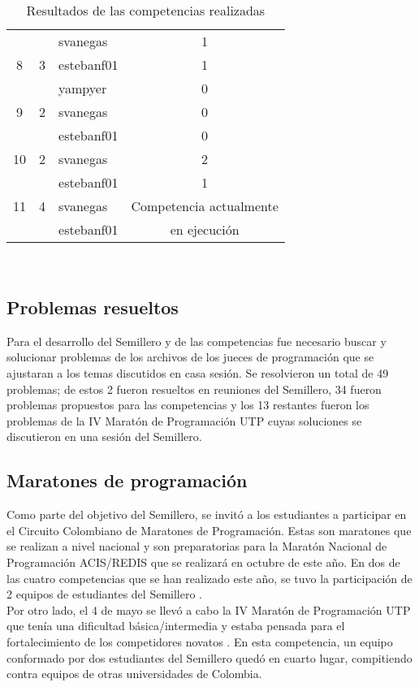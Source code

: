 \documentclass[conference]{IEEEtran}
\begin{document}
\begin{table}
\begin{tabular}{|c|c|l|c|}
		\hline
		  &   & svanegas & 1\\
		8 & 3 & estebanf01 & 1\\
		  &   & yampyer & 0\\
		\hline
		9 & 2 & svanegas & 0\\
		  &   & estebanf01 & 0\\
		\hline
		10 & 2 & svanegas & 2\\
		   &   & estebanf01 & 1\\
		\hline
		11 & 4 & svanegas & Competencia actualmente\\
		   &   & estebanf01 & en ejecución\\
		\hline
	\end{tabular} 
	
	\quad\\
	\caption{Resultados de las competencias realizadas}
	\label{Tabla:competencias}
\end{table}

\subsection{Problemas resueltos}
Para el desarrollo del Semillero y de las competencias fue necesario buscar y solucionar problemas de los archivos de los jueces de programación que se ajustaran a los temas discutidos en casa sesión. Se resolvieron un total de 49 problemas; de estos 2 fueron resueltos en reuniones del Semillero, 34 fueron problemas propuestos para las competencias y los 13 restantes fueron los problemas de la IV Maratón de Programación UTP cuyas soluciones se discutieron en una sesión del Semillero. 

\subsection{Maratones de programación}
Como parte del objetivo del Semillero, se invitó a los estudiantes a participar en el Circuito Colombiano de Maratones de Programación. Estas son maratones que se realizan a nivel nacional y son preparatorias para la Maratón Nacional de Programación ACIS/REDIS que se realizará en octubre de este año. En dos de las cuatro competencias que se han realizado este año, se tuvo la participación de 2 equipos de estudiantes del Semillero \cite{CCMP}.\\
Por otro lado, el 4 de mayo se llevó a cabo la IV Maratón de Programación UTP que tenía una dificultad básica/intermedia y estaba pensada para el fortalecimiento de los competidores novatos \cite{UTP}. En esta competencia, un equipo conformado por dos estudiantes del Semillero quedó en cuarto lugar, compitiendo contra equipos de otras universidades de Colombia.\\
\end{document}
